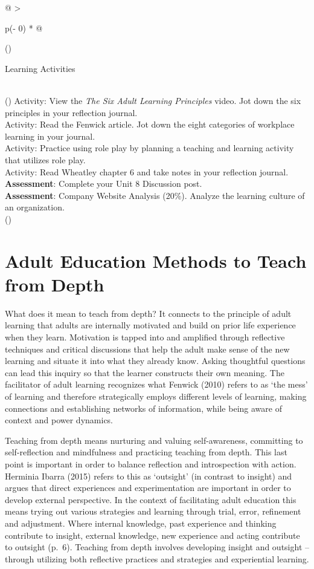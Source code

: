 \documentclass[
]{book}
\begin{document}
\begin{longtable}[]{@{}
  >{\raggedright\arraybackslash}p{(\columnwidth - 0\tabcolsep) * }@{}}
\toprule()
\begin{minipage}[b]{\linewidth}\raggedright
Learning Activities
\end{minipage} \\
\midrule()
\endhead
Activity: View the \emph{The Six Adult Learning Principles} video. Jot down the six principles in your reflection journal. \\
Activity: Read the Fenwick article. Jot down the eight categories of workplace learning in your journal. \\
Activity: Practice using role play by planning a teaching and learning activity that utilizes role play. \\
Activity: Read Wheatley chapter 6 and take notes in your reflection journal. \\
\textbf{Assessment}: Complete your Unit 8 Discussion post. \\
\textbf{Assessment}: Company Website Analysis (20\%). Analyze the learning culture of an organization. \\
\bottomrule()
\end{longtable}

\hypertarget{adult-education-methods-to-teach-from-depth}{%
\section{Adult Education Methods to Teach from Depth}\label{adult-education-methods-to-teach-from-depth}}

What does it mean to teach from depth? It connects to the principle of
adult learning that adults are internally motivated and build on prior
life experience when they learn. Motivation is tapped into and amplified
through reflective techniques and critical discussions that help the
adult make sense of the new learning and situate it into what they
already know. Asking thoughtful questions can lead this inquiry so that
the learner constructs their own meaning. The facilitator of adult
learning recognizes what Fenwick (2010) refers to as `the mess' of
learning and therefore strategically employs different levels of
learning, making connections and establishing networks of information,
while being aware of context and power dynamics.

Teaching from depth means nurturing and valuing self-awareness,
committing to self-reflection and mindfulness and practicing teaching
from depth. This last point is important in order to balance reflection
and introspection with action. Herminia Ibarra (2015) refers to this as
`outsight' (in contrast to insight) and argues that direct experiences
and experimentation are important in order to develop external
perspective. In the context of facilitating adult education this means
trying out various strategies and learning through trial, error,
refinement and adjustment. Where internal knowledge, past experience and
thinking contribute to insight, external knowledge, new experience and
acting contribute to outsight (p.~6). Teaching from depth involves
developing insight and outsight -- through utilizing both reflective
practices and strategies and experiential learning.
\end{document}
